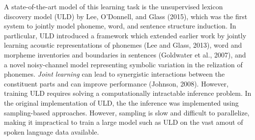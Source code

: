 \documentclass[12pt,letterpaper]{article}
\newif\ifcomments
\newcommand{\cm}[1]{\textcolor{purple}{\ifcomments[COMMENT: #1]\else\fi}}
\begin{document}
A state-of-the-art model of this learning task is the unsupervised lexicon discovery model (ULD) by Lee, O'Donnell, and Glass (2015), which was the first system to jointly model phoneme, word, and sentence structure induction.\cm{It was not obvious that there are three levels. so I fixed.} In partlicular, ULD introduced a framework which extended earlier work by jointly learning acoustic representations of phonemes (Lee and Glass, 2013), word and morpheme inventories and boundaries in sentences (Goldwater et al., 2007), and a novel noisy-channel model representing symbolic variation in the relization of phonemes.\cm{actually, we don't use fragment grammars---that's on the list of todos for us. Also, the way this was worded made it sound like we introduced joint learning, but that is an old idea.}
\textit{Joint learning} can lead to synergistic interactions between the constituent parts and can improve performance (Johnson, 2008).\cm{This preceding sentence seems out of place here since we don't say anything more interesting about synergies afterward. I would just delete.} However, training ULD requires solving a computationally intractable inference problem.\cm{This is also a somewhat weird thing to say, the problem is intractable, sampling is one solution to intractable problems, it is is just too slow in this case. Skipe right to saying that the original sampling implementation was too slow to run the simulations we wanted to. Maybe there is where you guys wanted to mention joint learning---with fasterinference we could explore more hypotheses there?}
In the original implementation of ULD, the the inference was implemented using sampling-based approaches.
However, sampling is slow and difficult to parallelize, making it impractical to train a large model such as ULD on the vast amout of spoken language data available.
\cm{Also, we can't run all of the interesting linguistics experiments that we want to.} \\
\end{document}
